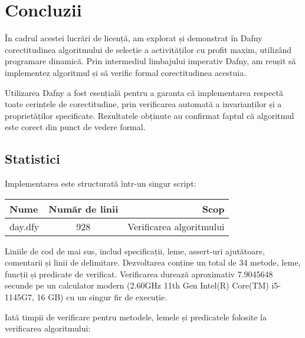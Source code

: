 \chapter*{Concluzii} 
În cadrul acestei lucrări de licență, am explorat și demonstrat în Dafny corectitudinea algoritmului de selecție a activităților cu profit maxim, utilizând programare dinamică. Prin intermediul limbajului imperativ Dafny, am reușit să implementez algoritmul și să verific formal corectitudinea acestuia.
 
Utilizarea Dafny a fost esențială pentru a garanta că implementarea respectă toate cerințele de corectitudine, prin verificarea automată a invarianților și a proprietăților specificate.
Rezultatele obținute au confirmat faptul că algoritmul este corect din punct de vedere formal.

\section{Statistici}
Implementarea este structurată într-un singur script:
\begin{table}[h!]
  \centering
  \begin{tabular}{lcr} %
    \toprule
    Nume & Număr de linii  & Scop \\
    \midrule
    day.dfy  & 928  & Verificarea algoritmului   \\
    \bottomrule
  \end{tabular}
  \label{tab:table1}
\end{table}

Liniile de cod de mai sus, includ specificații, leme, assert-uri ajutătoare, comentarii și linii de delimitare. Dezvoltarea conține un total de 34 metode, leme, funcții și predicate de verificat. Verificarea durează aproximativ 7.9045648 secunde pe un calculator modern (2.60GHz 11th Gen Intel(R) Core(TM) i5-1145G7, 16 GB) cu un singur fir de execuție. 

Iată timpii de verificare pentru metodele, lemele și predicatele folosite la verificarea algoritmului:

